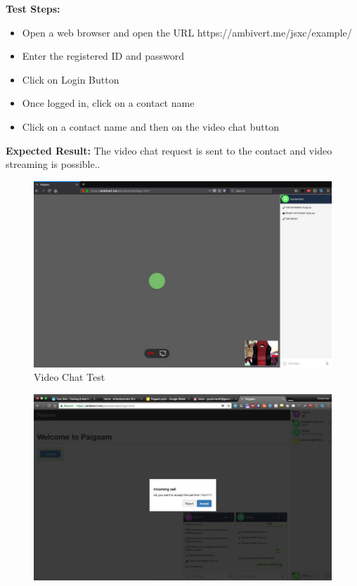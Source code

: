 \begin{itemize}
\noindent \textbf{Test Steps:}
\begin{itemize}
\item Open a web browser and open the URL https://ambivert.me/jsxc/example/
\item Enter the registered ID and password
\item Click on Login Button
\item Once logged in, click on a contact name
\item Click on a contact name and then on the video chat button
\end{itemize}
\noindent \textbf{Expected Result:}
The video chat request is sent to the contact and video streaming is possible..\\
\begin{figure}[ht]
\centering
\includegraphics[scale=0.3]{input/images/s31.png}
\caption{Video Chat Test}
\end{figure}
\begin{figure}[ht]
\centering
\includegraphics[scale=0.3]{input/images/s32.png}

\end{figure}
\end{itemize}
